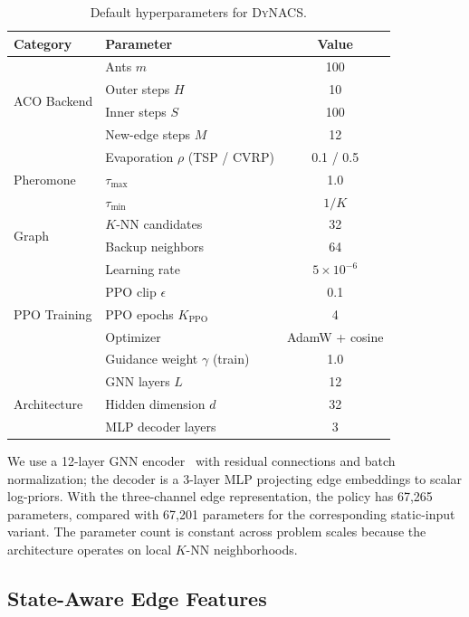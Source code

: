 \documentclass[journal]{IEEEtai}
\newcommand{\DyNACS}{\textsc{DyNACS}}
\begin{document}
\begin{table}[t]
\centering
\caption{Default hyperparameters for \DyNACS{}.}
\label{tab:hyperparams}
\small
\renewcommand{\arraystretch}{0.85}
\begin{tabular*}{\columnwidth}{@{\extracolsep{\fill}}llc@{}}
\toprule
Category & Parameter & Value \\
\midrule
\multirow{4}{*}{ACO Backend}
    & Ants $m$ & 100 \\
    & Outer steps $H$ & 10 \\
    & Inner steps $S$ & 100 \\
    & New-edge steps $M$ & 12 \\
\midrule
\multirow{3}{*}{Pheromone}
    & Evaporation $\rho$ (TSP / CVRP) & 0.1 / 0.5 \\
    & $\tau_{\max}$ & 1.0 \\
    & $\tau_{\min}$ & $1/K$ \\
\midrule
\multirow{2}{*}{Graph}
    & $K$-NN candidates & 32 \\
    & Backup neighbors & 64 \\
\midrule
\multirow{5}{*}{PPO Training}
    & Learning rate & $5 \times 10^{-6}$ \\
    & PPO clip $\epsilon$ & 0.1 \\
    & PPO epochs $K_{\text{PPO}}$ & 4 \\
    & Optimizer & AdamW + cosine \\
    & Guidance weight $\gamma$ (train) & 1.0 \\
\midrule
\multirow{3}{*}{Architecture}
    & GNN layers $L$ & 12 \\
    & Hidden dimension $d$ & 32 \\
    & MLP decoder layers & 3 \\
\bottomrule
\end{tabular*}
\end{table}

We use a 12-layer GNN encoder~\cite{deepaco} with residual connections and batch normalization; the decoder is a 3-layer MLP projecting edge embeddings to scalar log-priors. With the three-channel edge representation, the policy has 67,265 parameters, compared with 67,201 parameters for the corresponding static-input variant. The parameter count is constant across problem scales because the architecture operates on local $K$-NN neighborhoods.

\subsection{State-Aware Edge Features}
\label{app:features}
\end{document}
